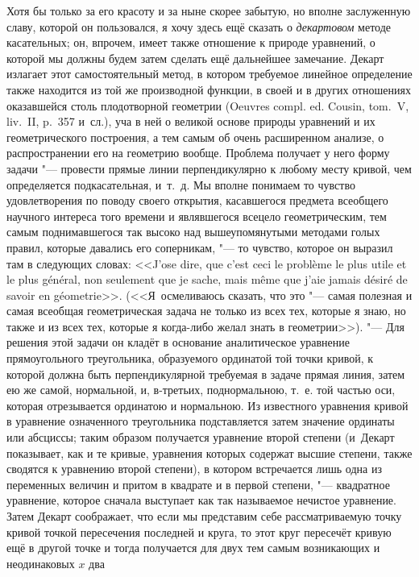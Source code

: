 Хотя бы только за его красоту и за ныне скорее забытую, но вполне заслуженную
славу, которой он пользовался, я хочу здесь ещё сказать о {\em декартовом}
методе касательных; он, впрочем, имеет также отношение к природе уравнений, о
которой мы должны будем затем сделать ещё дальнейшее замечание. Декарт излагает
этот самостоятельный метод, в котором требуемое линейное определение также
находится из той же производной функции, в своей и в других отношениях
оказавшейся столь плодотворной геометрии (Oeuvres compl. ed. Cousin, tom.~V,
liv.~II, p.~357 и~сл.), уча в ней о великой основе природы уравнений и их
геометрического построения, а тем самым об очень расширенном анализе, о
распространении его на геометрию вообще. Проблема получает у него форму задачи
"--- провести прямые линии перпендикулярно к любому месту кривой, чем
определяется подкасательная, и~т.~д. Мы вполне понимаем то чувство
удовлетворения по поводу своего открытия, касавшегося предмета всеобщего
научного интереса того времени и являвшегося всецело геометрическим, тем самым
поднимавшегося так высоко над вышеупомянутыми методами голых правил, которые
давались его соперникам, "--- то чувство, которое он выразил там в следующих
словах: <<J’ose dire, que c’est ceci le problème le plus utile et le plus
général, non seulement que je sache, mais même que j’aie jamais désiré de
savoir en géometrie>>. (<<Я~осмеливаюсь сказать, что это "--- самая полезная и
самая всеобщая геометрическая задача не только из всех тех, которые я знаю, но
также и из всех тех, которые я когда-либо желал знать в геометрии>>). "--- Для
решения этой задачи он кладёт в основание аналитическое уравнение
прямоугольного треугольника, образуемого ординатой той точки кривой, к которой
должна быть перпендикулярной требуемая в задаче прямая линия, затем ею же
самой, нормальной, и, в-третьих, поднормальною, т.~е. той частью оси, которая
отрезывается ординатою и нормальною. Из известного уравнения кривой в уравнение
означенного треугольника подставляется затем значение ординаты или абсциссы;
таким образом получается уравнение второй степени (и~Декарт показывает, как и
те кривые, уравнения которых содержат высшие степени, также сводятся к
уравнению второй степени), в котором встречается лишь одна из переменных
величин и притом в квадрате и в первой степени, "--- квадратное уравнение,
которое сначала выступает как так называемое нечистое уравнение. Затем Декарт
соображает, что если мы представим себе рассматриваемую точку кривой точкой
пересечения последней и круга, то этот круг пересечёт кривую ещё в другой точке
и тогда получается для двух тем самым возникающих и неодинаковых $x$ два

